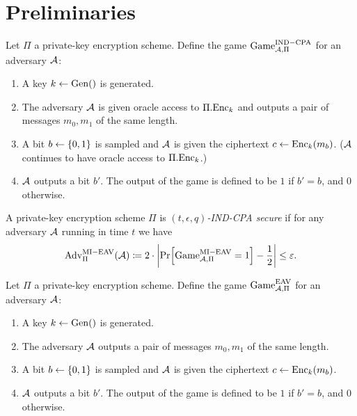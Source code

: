 \chapter{Preliminaries}



\begin{definition}
	Let $\Pi$ a private-key encryption scheme. Define the game $\mathrm{Game}_{\mathcal{A}, \Pi}^{\mathrm{IND-CPA}}$ for an adversary $\mathcal{A}$:
	\begin{enumerate}[1.]
		\item A key $k \leftarrow \mathrm{Gen}()$ is generated.
		\item The adversary $\mathcal{A}$ is given oracle access to $\Pi.\mathrm{Enc}_k$ and outputs a pair of messages $m_0, m_1$ of the same length.
		\item A bit $b \leftarrow \{0, 1\}$ is sampled and $\mathcal{A}$ is given the ciphertext $c \leftarrow \mathrm{Enc}_k(m_b)$. ($\mathcal{A}$ continues to have oracle access to $\Pi.\mathrm{Enc}_k$.)
		\item $\mathcal{A}$ outputs a bit $b'$. The output of the game is defined to be $1$ if $b' = b$, and $0$ otherwise.
	\end{enumerate}
\end{definition}

\begin{definition}
	A private-key encryption scheme $\Pi$ is \emph{$(t, \epsilon, q)$-IND-CPA secure} if for any adversary $\mathcal{A}$ running in time $t$ we have
	\begin{align*}
		\mathrm{Adv}_{\Pi}^{\mathrm{MI-EAV}}(\adv) \coloneqq 2 \cdot \abs*{\pr{\mathrm{Game}_{\adv, \Pi}^{\mathrm{MI-EAV}} = 1} - \frac{1}{2}} \le \epsilon.
	\end{align*}
\end{definition}


\begin{definition}
	Let $\Pi$ a private-key encryption scheme. Define the game $\mathrm{Game}_{\mathcal{A}, \Pi}^{\mathrm{EAV}}$ for an adversary $\mathcal{A}$:
	\begin{enumerate}[1.]
		\item A key $k \leftarrow \mathrm{Gen}()$ is generated.
		\item The adversary $\mathcal{A}$ outputs a pair of messages $m_0, m_1$ of the same length.
		\item A bit $b \leftarrow \{0, 1\}$ is sampled and $\mathcal{A}$ is given the ciphertext $c \leftarrow \mathrm{Enc}_k(m_b)$.
		\item $\mathcal{A}$ outputs a bit $b'$. The output of the game is defined to be $1$ if $b' = b$, and $0$ otherwise.
	\end{enumerate}
\end{definition}

